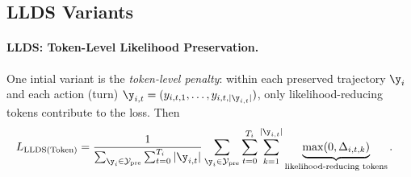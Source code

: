 

\subsection{LLDS Variants}\label{sec:variant}

\paragraph{LLDS: Token-Level Likelihood Preservation.}
One intial variant is the \emph{token-level penalty}: within each preserved trajectory $\y_i$
and each action (turn) $\y_{i,t} = (y_{i,t,1},\dots,y_{i,t,|\y_{i,t}|})$,
only likelihood-reducing tokens contribute to the loss. Then
\begin{align}
L_{\rm LLDS(Token)}
&=
\frac{1}{\sum_{\y_i\in \mathcal{Y}_{\rm pre}} \sum_{t=0}^{T_i} |\y_{i,t}|}
\sum_{\y_i\in \mathcal{Y}_{\rm pre}}
\sum_{t=0}^{T_i}
\sum_{k=1}^{|\y_{i,t}|}
\underbrace{\max(0,\Delta_{i,t,k})}_{\text{likelihood-reducing tokens}} .
\end{align}


